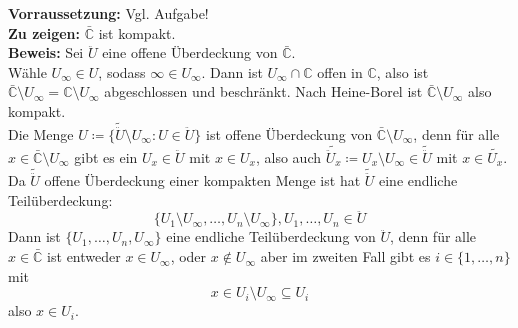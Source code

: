\begin{problem}[2]
  \textbf{Vorraussetzung:} Vgl. Aufgabe! \\
  \textbf{Zu zeigen:} \( \bar{\mathbb{C}} \) ist kompakt. \\
  \textbf{Beweis:} Sei \( \ddot{U} \) eine offene Überdeckung von \( \bar{\mathbb{C}} \). \\
  Wähle \( U_{\infty} \in U \), sodass \( \infty \in U_{\infty} \). Dann ist \( U_{\infty} \cap \mathbb{C} \) offen in \( \mathbb{C} \), also ist \( \bar{\mathbb{C}} \setminus U_{\infty} = \mathbb{C} \setminus U_{\infty} \) abgeschlossen und beschränkt. Nach Heine-Borel ist \( \bar{\mathbb{C}} \setminus U_{\infty} \) also kompakt. \\
  Die Menge \( U \coloneqq \{ \tilde{\ddot{U}} \setminus U_{\infty} : U \in \ddot{U} \} \) ist offene Überdeckung von \( \bar{\mathbb{C}} \setminus U_{\infty} \), denn für alle \( x \in \bar{\mathbb{C}} \setminus U_{\infty} \) gibt es ein \( U_x \in \ddot{U} \) mit \( x \in U_x \), also auch \( \tilde{\ddot{U}_x} \coloneqq U_x \setminus U_{\infty} \in \tilde{\ddot{U}} \) mit \( x \in \tilde{U_x}. \) \\
  Da \( \tilde{\ddot{U}} \) offene Überdeckung einer kompakten Menge ist hat \( \tilde{\ddot{U}} \) eine endliche Teilüberdeckung: 
  \begin{equation*}
    \{ U_1 \setminus U_{\infty}, \dots, U_n \setminus U_{\infty} \}, U_1, \dots, U_n \in \ddot{U}
  \end{equation*}
  Dann ist \( \{ U_1, \dots, U_n, U_{\infty} \} \) eine endliche Teilüberdeckung von \( \ddot{U} \), denn für alle
  \( x \in \bar{\mathbb{C}} \) ist entweder \( x \in U_{\infty} \), oder \( x \notin U_{\infty} \) aber im zweiten Fall gibt es \( i \in \{ 1, \dots, n \} \) mit 
  \begin{equation*}
    x \in U_i \setminus U_{\infty} \subseteq U_i
  \end{equation*} 
  also \( x \in U_i \).
\end{problem}
